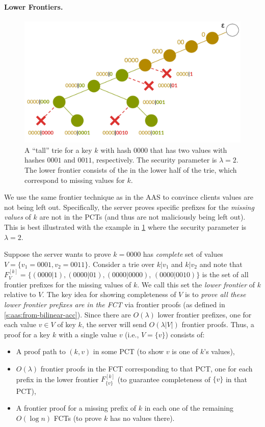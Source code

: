\paragraph{Lower Frontiers.}
\begin{figure}[t]
    \centering
    \includegraphics[width=\columnwidth]{figures-aad/lower-frontier.pdf}
    \vspace{-1.0cm}
    \caption{
        A ``tall'' trie for a key $k$ with hash $0000$ that has two values with hashes $0001$ and $0011$, respectively.
        The security parameter is $\lambda=2$.
        The lower frontier consists of the  in the lower half of the trie, which correspond to missing values for $k$.
    }
    \label{f:lower-frontier}
\end{figure}
We use the same frontier technique as in the AAS to convince clients values are not being left out.
Specifically, the server proves specific prefixes for the \textit{missing values} of $k$ are not in the PCTs (and thus are not maliciously being left out).
This is best illustrated with the example in \cref{f:lower-frontier} where the security parameter is $\lambda=2$.

Suppose the server wants to prove $k=0000$ has \textit{complete} set of values $V=\{v_1 = 0001, v_2 = 0011\}$.
Consider a trie over $k|v_1$ and $k|v_2$ and note that $F^{[k]}_V = \{(0000|1), (0000|01), (0000|0000)$, $(0000|0010)\}$ is the set of all frontier prefixes for the missing values of $k$.
We call this set the \textit{lower frontier} of $k$ relative to $V$.
The key idea for showing completeness of $V$ is to \textit{prove all these lower frontier prefixes are in the FCT} via frontier proofs (as defined in \cref{s:aas:from-bilinear-acc}).
Since there are $O(\lambda)$ lower frontier prefixes, one for each value $v\in V$ of key $k$, the server will send $O(\lambda|V|)$ frontier proofs.
Thus, a proof for a key $k$ with a single value $v$ (i.e., $V=\{v\}$) consists of:
\begin{itemize}
    \item A proof path to $(k,v)$ in some PCT (to show $v$ is one of $k$'s values),
    \item $O(\lambda)$ frontier proofs in the FCT corresponding to that PCT, one for each prefix in the lower frontier $F^{[k]}_{\{v\}}$ (to guarantee completeness of $\{v\}$ in that PCT),
    \item A frontier proof for a missing prefix of $k$ in each one of the remaining $O(\log{n})$ FCTs (to prove $k$ has no values there).
\end{itemize}

